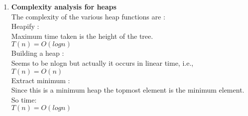 \documentclass[a4paper,11pt]{article}
\begin{document}
\begin{enumerate}
 \item \textbf{Complexity analysis for heaps}\\
The complexity of the various heap functions are : \\
Heapify : \\
Maximum time taken is the height of the tree.\\
$T(n) = O(log{n})$\\
Building a heap :\\
Seems to be nlogn but actually it occurs in linear time, i.e., \\
$T(n) = O(n)$\\
Extract minimum :\\
Since this is a minimum heap the topmost element is the minimum element. So time:\\
$T(n) = O(logn)$\\

\end{enumerate}
\end{document}
